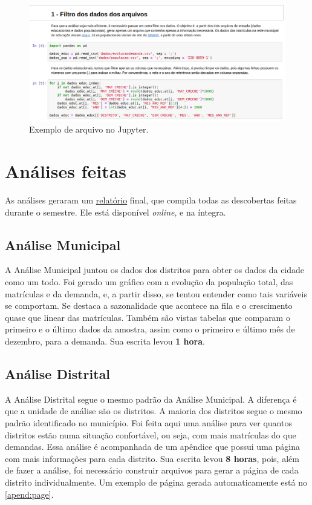 \documentclass[12pt, a4paper]{article}
\begin{document}
\begin{figure}[H]
	\centering
	\includegraphics[width=0.8\linewidth]{jupyter}
	\caption{Exemplo de arquivo no Jupyter.}
	\label{fig:jupyter}
\end{figure}


\section{Análises feitas}

As análises geraram um \href{https://lsflp.github.io/MAC0213/relatorios/relatorio.pdf}{relatório} final, que compila todas as descobertas feitas durante o semestre. Ele está disponível \textit{online}, e na íntegra.

\subsection{Análise Municipal}

A Análise Municipal juntou os dados dos distritos para obter os dados da cidade como um todo. Foi gerado um gráfico com a evolução da população total, das matrículas e da demanda, e, a partir disso, se tentou entender como tais variáveis se comportam. Se destaca a sazonalidade que acontece na fila e o crescimento quase que linear das matrículas. Também são vistas tabelas que comparam o primeiro e o último dados da amostra, assim como o primeiro e último mês de dezembro, para a demanda. Sua escrita levou \textbf{1 hora}.

\subsection{Análise Distrital}

A Análise Distrital segue o mesmo padrão da Análise Municipal. A diferença é que a unidade de análise são os distritos. A maioria dos distritos segue o mesmo padrão identificado no município. Foi feita aqui uma análise para ver quantos distritos estão numa situação confortável, ou seja, com mais matrículas do que demandas. Essa análise é acompanhada de um apêndice que possui uma página com mais informações para cada distrito. Sua escrita levou \textbf{8 horas}, pois, além de fazer a análise, foi necessário construir arquivos para gerar a página de cada distrito individualmente. Um exemplo de página gerada automaticamente está no \autoref{apend:page}.
\end{document}
